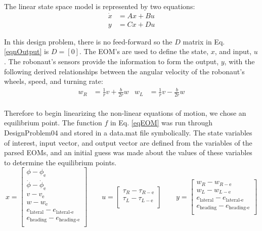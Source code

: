 \documentclass{article}
\begin{document}
\par
The linear state space model is represented by two equations:
\begin{align}
\dot{x} &= Ax + Bu \label{eqnState}\\
y &= Cx + Du \label{eqnOutput}
\end{align}

In this design problem, there is no feed-forward so the $D$ matrix in Eq.\eqref{eqnOutput} is $D = [0]$. The EOM's are used to define the state, $x$, and input, $u$. The robonaut's sensors provide the information to form the output, $y$, with the following derived relationships between the angular velocity of the robonaut's wheels, speed, and turning rate:
\begin{align}
w_{R} & = \frac{1}{r}v + \frac{b}{2r}w  & 
w_{L} & = \frac{1}{r}v - \frac{b}{2r}w 
\end{align}
\\
Therefore to begin linearizing the non-linear equations of motion, we chose an equilibrium point. The function $f$ in Eq. \eqref{eqEOM} was run through DesignProblem04 and stored in a data.mat file symbolically. The state variables of interest, input vector, and output vector are defined from the variables of the parsed EOMs, and an initial guess was made about the values of these variables to determine the equilibrium points.
\begin{equation}
\label{eqnState}
x=
\begin{bmatrix}
\phi - \phi_{\text{e}}\\
\dot{\phi} - \dot{\phi}_{\text{e}}\\
v - v_{\text{e}}\\
w- w_{\text{e}}\\
e_\text{lateral} - e_\text{lateral-e} \\
e_\text{heading} - e_\text{heading-e}\\
\end{bmatrix} \qquad
u =
\begin{bmatrix}
\tau_{R} - \tau_{R-\text{e}}\\
\tau_{L} - \tau_{L-\text{e}}\\
\end{bmatrix} \qquad
y =
\begin{bmatrix}
w_{R} - w_{R-\text{e}}\\
w_{L} - w_{L-\text{e}}\\
e_\text{lateral} - e_\text{lateral-e} \\
e_\text{heading} - e_\text{heading-e}\\
\end{bmatrix}
\end{equation}
\end{document}
